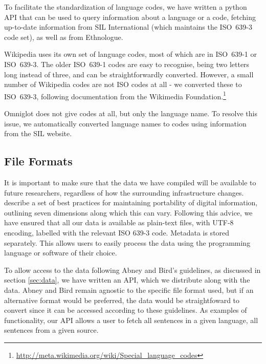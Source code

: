 To facilitate the standardization of language codes, we have written a python API that can be used to query information about a language or a code, fetching up-to-date information from SIL International (which maintains the ISO~639-3 code set), as well as from Ethnologue.

Wikipedia uses its own set of language codes, most of which are in ISO~639-1 or ISO~639-3.  The older ISO~639-1 codes are easy to recognise, being two letters long instead of three, and can be straightforwardly converted.  However, a small number of Wikipedia codes are not ISO codes at all - we converted these to ISO~639-3, following documentation from the Wikimedia Foundation.\footnote{\url{http://meta.wikimedia.org/wiki/Special_language_codes}}

Omniglot does not give codes at all, but only the language name. To resolve this issue, we automatically converted language names to codes using information from the SIL website.

\subsection{File Formats}

It is important to make sure that the data we have compiled will be available to future researchers, regardless of how the surrounding infrastructure changes.  describe a set of best practices for maintaining portability of digital information, outlining seven dimensions along which this can vary. Following this advice, we have ensured that all our data is available as plain-text files, with UTF-8 encoding, labelled with the relevant ISO 639-3 code. Metadata is stored separately. This allows users to easily process the data using the programming language or software of their choice.

To allow access to the data following Abney and Bird's guidelines, as discussed in section \ref{sec:data}, we have written an API, which we distribute along with the data.  Abney and Bird remain agnostic to the specific file format used, but if an alternative format would be preferred, the data would be straightfoward to convert since it can be accessed according to these guidelines.  As examples of functionality, our API allows a user to fetch all sentences in a given language, all sentences from a given source.